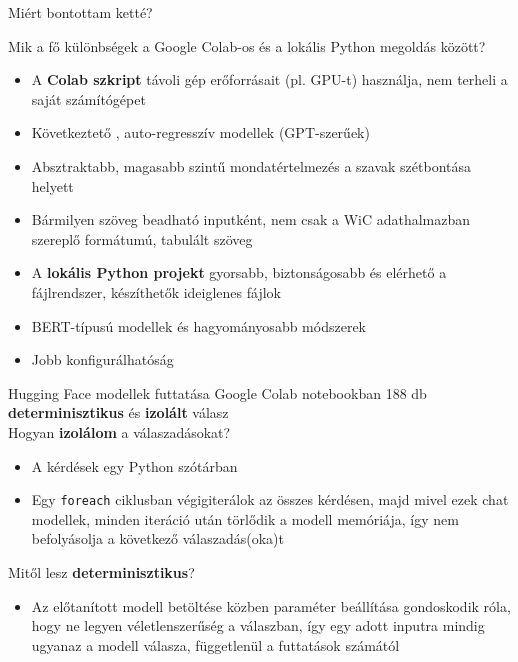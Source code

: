 \documentclass{beamer}
\begin{document}
    \begin{frame}{Miért bontottam ketté?}

        Mik a fő különbségek a Google Colab-os és a lokális Python megoldás között?
        \begin{itemize}
            \item A \textbf{Colab szkript} távoli gép erőforrásait (pl. GPU-t) használja, nem terheli a saját számítógépet\\
            \item Következtető , auto-regresszív modellek (GPT-szerűek)
            \item Absztraktabb, magasabb szintű mondatértelmezés a szavak szétbontása helyett \\
            \item  Bármilyen szöveg beadható inputként, nem csak a WiC adathalmazban szereplő formátumú, tabulált szöveg
            \vspace*{0.3cm}
            \item A \textbf{lokális Python projekt} gyorsabb, biztonságosabb és elérhető a fájlrendszer, készíthetők ideiglenes fájlok\\
            \item BERT-típusú modellek és hagyományosabb módszerek\\
            \item Jobb konfigurálhatóság
        \end{itemize}

    \end{frame}


    \begin{frame}{Hugging Face modellek futtatása Google Colab notebookban}
        188 db \textbf{determinisztikus} és \textbf{izolált} válasz\\  Hogyan \textbf{izolálom} a válaszadásokat? \\
        \begin{itemize}
            \item A kérdések egy Python szótárban\\
            \item Egy \texttt{foreach} ciklusban végigiterálok az összes kérdésen, majd mivel ezek chat modellek, minden iteráció után törlődik a modell memóriája, így nem befolyásolja a következő válaszadás(oka)t\\
        \end{itemize}
        Mitől lesz \textbf{determinisztikus}?\\
        \begin{itemize}
            \item Az előtanított modell betöltése közben paraméter beállítása gondoskodik róla, hogy ne legyen véletlenszerűség a válaszban, így egy adott inputra mindig ugyanaz a modell válasza, függetlenül a futtatások számától\\
        \end{itemize}

    \end{frame}
\end{document}
